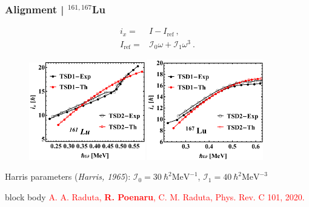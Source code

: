 \documentclass{beamer}
\begin{document}
\begin{frame}
	\frametitle{Alignment | $^{161,167}$Lu}
	\vspace{-0.5cm}
	\begin{align}
		i_x=&I-I_\text{ref}\ ,\nonumber\\
		I_\text{ref}=&\mathcal{I}_0\omega+\mathcal{I}_1\omega^3\ .\nonumber
	\end{align}
	\vspace{-0.5cm}
	\begin{figure}
		\centering
		\includegraphics[width=0.45\textwidth]{figures/Lu-exp-energies/fig7.pdf}
		\includegraphics[width=0.45\textwidth]{figures/Lu-exp-energies/fig10.pdf}
	\end{figure}
	Harris parameters (\textit{Harris, 1965}): $\mathcal{I}_0=30\ \hbar^2\text{MeV}^{-1}$, $\mathcal{I}_1=40\ \hbar^2\text{MeV}^{-3}$ %
	\begin{beamercolorbox}[rounded=true,shadow=false, wd=\linewidth,]{block body}
		\centering
		\textcolor{red}{\footnotesize{A. A. Raduta, \textbf{R. Poenaru}, C. M. Raduta, Phys. Rev. C 101, 2020.}}
	\end{beamercolorbox}
\end{frame}
\end{document}

